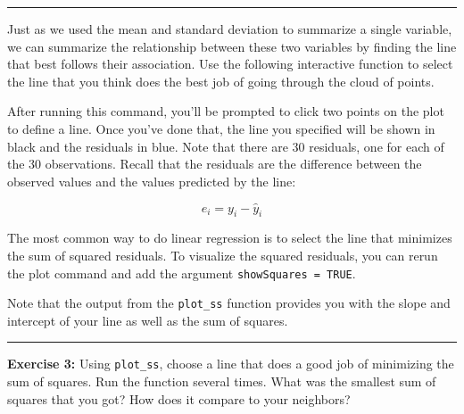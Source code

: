\documentclass[]{book}
\newenvironment{Shaded}{\begin{snugshade}}{\end{snugshade}}
\newcommand{\KeywordTok}[1]{\textcolor[rgb]{0.13,0.29,0.53}{\textbf{{#1}}}}
\newcommand{\DataTypeTok}[1]{\textcolor[rgb]{0.13,0.29,0.53}{{#1}}}
\newcommand{\OtherTok}[1]{\textcolor[rgb]{0.56,0.35,0.01}{{#1}}}
\newcommand{\NormalTok}[1]{{#1}}
\theoremstyle{definition}
\theoremstyle{definition}
\theoremstyle{definition}
\theoremstyle{remark}
\begin{document}
\begin{center}\rule{0.5\linewidth}{\linethickness}\end{center}

Just as we used the mean and standard deviation to summarize a single
variable, we can summarize the relationship between these two variables
by finding the line that best follows their association. Use the
following interactive function to select the line that you think does
the best job of going through the cloud of points.

\begin{Shaded}
\end{Shaded}

After running this command, you'll be prompted to click two points on
the plot to define a line. Once you've done that, the line you specified
will be shown in black and the residuals in blue. Note that there are 30
residuals, one for each of the 30 observations. Recall that the
residuals are the difference between the observed values and the values
predicted by the line:

\[
  e_i = y_i - \hat{y}_i
\]

The most common way to do linear regression is to select the line that
minimizes the sum of squared residuals. To visualize the squared
residuals, you can rerun the plot command and add the argument
\texttt{showSquares\ =\ TRUE}.

\begin{Shaded}
\end{Shaded}

Note that the output from the \texttt{plot\_ss} function provides you
with the slope and intercept of your line as well as the sum of squares.

\begin{center}\rule{0.5\linewidth}{\linethickness}\end{center}

\textbf{Exercise 3:} Using \texttt{plot\_ss}, choose a line that does a
good job of minimizing the sum of squares. Run the function several
times. What was the smallest sum of squares that you got? How does it
compare to your neighbors?
\end{document}
